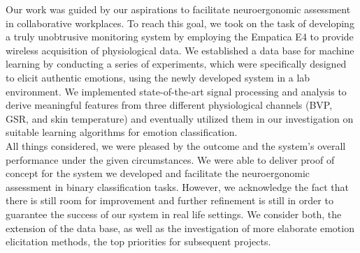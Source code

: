 
Our work was guided by our aspirations to facilitate neuroergonomic assessment in collaborative workplaces. To reach this goal, we took on the task of developing a truly unobtrusive monitoring system by employing the Empatica E4 to provide wireless acquisition of physiological data. We established a data base for machine learning by conducting a series of experiments, which were specifically designed to elicit authentic emotions, using the newly developed system in a lab environment. We implemented state-of-the-art signal processing and analysis to derive meaningful features from three different physiological channels (BVP, GSR, and skin temperature) and eventually utilized them in our investigation on suitable learning algorithms for emotion classification.\\
All things considered, we were pleased by the outcome and the system's overall performance under the given circumstances. We were able to deliver proof of concept for the system we developed and facilitate the neuroergonomic assessment in binary classification tasks. However, we acknowledge the fact that there is still room for improvement and further refinement is still in order to guarantee the success of our system in real life settings. We consider both, the extension of the data base, as well as the investigation of more elaborate emotion elicitation methods, the top priorities for subsequent projects.




